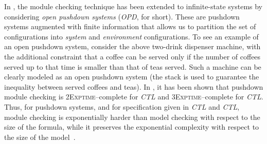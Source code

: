 \documentclass{LMCS}
\theoremstyle{plain}
\def \CTL           {\emph{CTL}\xspace}
\def \CTLSTAR       {\emph{CTL}\xspace}
\def \OPD           {\emph{OPD}\xspace}
\def \THREEEXPTIME  {\textsc{3Exptime}\xspace}
\def \TWOEXPTIME    {\textsc{2Exptime}\xspace}
\begin{document}
In \cite{BMP05,AMV07}, the module checking technique has been extended to
infinite-state systems by considering \emph{open pushdown systems} (\OPD, for
short). These are pushdown systems augmented with finite information that
allows us to partition the set of configurations into \emph{system} and
\emph{environment} configurations. To see an example of an open pushdown
system, consider the above two-drink dispenser machine, with the additional
constraint that a coffee can be served only if the number of coffees served up
to that time is smaller than that of teas served. Such a machine can be clearly
modeled as an open pushdown system (the stack is used to guarantee the
inequality between served coffees and teas). In \cite{BMP05}, it has been shown
that pushdown module checking is \TWOEXPTIME--complete for \CTL and
\THREEEXPTIME--complete for \CTLSTAR. Thus, for pushdown systems, and for
specification given in \CTL and \CTLSTAR, module checking is exponentially
harder than model checking with respect to the size of the formula, while it
preserves the exponential complexity with respect to the size of the
model~\cite{Wal96,Wal00}.
\end{document}
